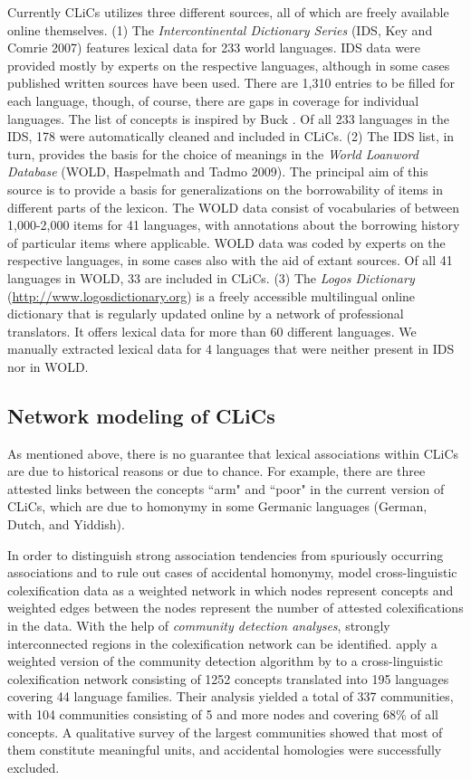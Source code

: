 Currently CLiCs utilizes three different sources, all of which are freely available online
themselves.  (1) The \emph{Intercontinental Dictionary Series} (IDS, Key and Comrie 2007) 
\nocite{Key2007} features lexical
data for 233 world languages. IDS data were provided mostly by experts on the respective languages,
although in some cases published written sources have been used. There are 1,310 entries to be
filled for each language, though, of course, there are gaps in coverage for individual languages.
The list of concepts is inspired by Buck . Of all 233 languages in the IDS, 178 were
automatically cleaned and included in CLiCs.  (2) The IDS list, in turn, provides the basis for the
choice of meanings in the \emph{World Loanword Database} (WOLD, Haspelmath and Tadmo 2009).
\nocite{Wold2009} The principal aim
of this source is to provide a basis for generalizations on the borrowability of items in different
parts of the lexicon. The WOLD data consist of vocabularies of between 1,000-2,000 items for 41
languages, with annotations about the borrowing history of particular items where applicable. WOLD
data was coded by experts on the respective languages, in some cases also with the aid of extant
sources. Of all 41 languages in WOLD, 33 are included in CLiCs.  (3) The \emph{Logos Dictionary}
(\url{http://www.logosdictionary.org}) is a freely accessible multilingual online dictionary that is
regularly updated online by a network of professional translators. It offers lexical data for more
than 60 different languages. We manually extracted lexical data for 4 languages that were neither
present in IDS nor in WOLD. 


\subsection{Network modeling of CLiCs}
As mentioned above, there is no guarantee that lexical associations within CLiCs are due to
historical reasons or due to chance. For example, there are three attested links between the
concepts ``arm" and ``poor" in the current version of CLiCs, which are due to homonymy in some
Germanic languages (German, Dutch, and Yiddish).
 
In order to distinguish strong
association tendencies from
spuriously occurring associations and to rule out cases of accidental homonymy,  model cross-linguistic colexification data as a weighted network
in which nodes represent concepts and weighted edges between the nodes represent the number of
attested colexifications in the data.  With the help of \emph{community detection analyses}, strongly
interconnected regions in the colexification network can be identified.  apply
a weighted version of the community detection algorithm by  to a
cross-linguistic colexification network consisting of 1252 concepts translated into 195 languages
covering 44 language families. Their analysis yielded a total of 337 communities, with 104 communities
consisting of 5 and more nodes and covering 68\% of all concepts. A qualitative survey of the
largest communities showed that most of them constitute meaningful units, and accidental homologies
were successfully excluded.
